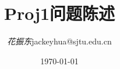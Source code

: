 \documentclass[12pt,a4paper]{ctexart}
\title{\textbf{Proj1问题陈述}} %
\author{
\begin{tabular}{ll}
  \textit{花振东} & jackeyhua@sjtu.edu.cn \\
\end{tabular}
}
\date{\today} %
\begin{document}
\maketitle %





%
%

\pagebreak


%
%
\end{document}
